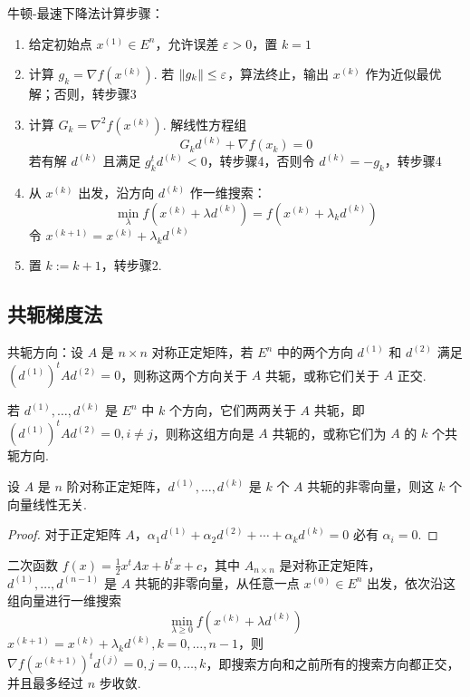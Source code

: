 \begin{note}
    牛顿-最速下降法计算步骤：\begin{enumerate}
        \item 给定初始点 $x^{(1)} \in E^n$，允许误差 $\varepsilon > 0$，置 $k = 1$
        \item 计算 $g_k = \nabla f(x^{(k)})$. 若 $\norm{g_k} \le \varepsilon$，算法终止，输出 $x^{(k)}$ 作为近似最优解；否则，转步骤3
        \item 计算 $G_k = \nabla^2f(x^{(k)})$. 解线性方程组\[G_kd^{(k)} + \nabla f(x_k) = 0\] 若有解 $d^{(k)}$ 且满足 $g_k^td^{(k)} < 0$，转步骤4，否则令 $d^{(k)} = -g_k$，转步骤4
        \item 从 $x^{(k)}$ 出发，沿方向 $d^{(k)}$ 作一维搜索：\[\min_{\lambda} f(x^{(k)} + \lambda d^{(k)}) = f(x^{(k)} + \lambda_k d^{(k)})\] 令 $x^{(k + 1)} = x^{(k)} + \lambda_k d^{(k)}$
        \item 置 $k := k + 1$，转步骤2.
    \end{enumerate}
\end{note}

\subsection{共轭梯度法}
\begin{note}
    共轭方向：设 $A$ 是 $n \times n$ 对称正定矩阵，若 $E^n$ 中的两个方向 $d^{(1)}$ 和 $d^{(2)}$ 满足 $(d^{(1)})^tAd^{(2)} = 0$，则称这两个方向关于 $A$ 共轭，或称它们关于 $A$ 正交.

    若 $d^{(1)}, \dots, d^{(k)}$ 是 $E^n$ 中 $k$ 个方向，它们两两关于 $A$ 共轭，即 $(d^{(1)})^tAd^{(2)} = 0, i \neq j$，则称这组方向是 $A$ 共轭的，或称它们为 $A$ 的 $k$ 个共轭方向.
\end{note}

\begin{theorem}
    设 $A$ 是 $n$ 阶对称正定矩阵，$d^{(1)}, \dots, d^{(k)}$ 是 $k$ 个 $A$ 共轭的非零向量，则这 $k$ 个向量线性无关.
    \begin{proof}
        对于正定矩阵 $A$，$\alpha_{1} d^{(1)}+\alpha_{2} d^{(2)}+\cdots+\alpha_{k} d^{(k)}=0$ 必有 $\alpha_i = 0$.
    \end{proof}
\end{theorem}

\begin{theorem}
    二次函数 $f(x) = \frac{1}{2}x^tAx + b^tx + c$，其中 $A_{n \times n}$ 是对称正定矩阵，$d^{(1)}, \dots, d^{(n - 1)}$ 是 $A$ 共轭的非零向量，从任意一点 $x^{(0)} \in E^n$ 出发，依次沿这组向量进行一维搜索\[\underset{\lambda \ge 0}{\min} f(x^{(k)} + \lambda d^{(k)})\]$x^{(k + 1)} = x^{(k)} + \lambda_k d^{(k)}, k = 0, \dots, n - 1$，则 $\nabla f(x^{(k + 1)})^t d^{(j)} = 0, j = 0, \dots, k$，即搜索方向和之前所有的搜索方向都正交，并且最多经过 $n$ 步收敛.
\end{theorem}

